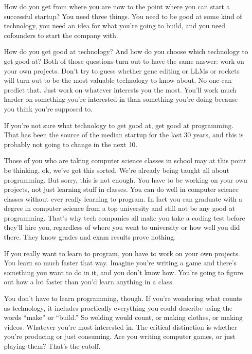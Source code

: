 How do you get from where you are now to the point where you can start a
successful startup? You need three things. You need to be good at some
kind of technology, you need an idea for what you're going to build, and
you need cofounders to start the company with.

How do you get good at technology? And how do you choose which
technology to get good at? Both of those questions turn out to have the
same answer: work on your own projects. Don't try to guess whether gene
editing or LLMs or rockets will turn out to be the most valuable
technology to know about. No one can predict that. Just work on whatever
interests you the most. You'll work much harder on something you're
interested in than something you're doing because you think you're
supposed to.

If you're not sure what technology to get good at, get good at
programming. That has been the source of the median startup for the last
30 years, and this is probably not going to change in the next 10.

Those of you who are taking computer science classes in school may at
this point be thinking, ok, we've got this sorted. We're already being
taught all about programming. But sorry, this is not enough. You have to
be working on your own projects, not just learning stuff in classes. You
can do well in computer science classes without ever really learning to
program. In fact you can graduate with a degree in computer science from
a top university and still not be any good at programming. That's why
tech companies all make you take a coding test before they'll hire you,
regardless of where you went to university or how well you did there.
They know grades and exam results prove nothing.

If you really want to learn to program, you have to work on your own
projects. You learn so much faster that way. Imagine you're writing a
game and there's something you want to do in it, and you don't know how.
You're going to figure out how a lot faster than you'd learn anything in
a class.

You don't have to learn programming, though. If you're wondering what
counts as technology, it includes practically everything you could
describe using the words ``make'' or ``build.'' So welding would count,
or making clothes, or making videos. Whatever you're most interested in.
The critical distinction is whether you're producing or just consuming.
Are you writing computer games, or just playing them? That's the cutoff.

